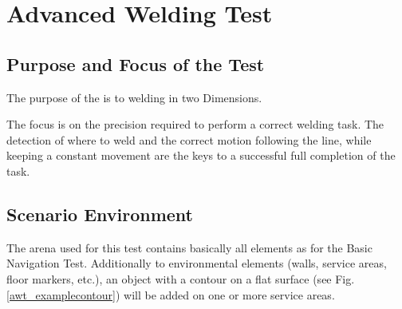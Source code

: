 \newpage
\section{Advanced Welding Test}

\subsection{Purpose and Focus of the Test}
The purpose of the  is to welding in two Dimensions. 
\par
The focus is on the precision required to perform a correct welding task. The detection of where to weld and the correct motion following the line, while keeping a constant movement are the keys to a successful full completion of the task. 

\subsection{Scenario Environment}
The arena used for this test contains basically all elements as for the Basic Navigation Test. Additionally to environmental elements (walls, service areas, floor markers, etc.), an object with a contour on a flat surface (see Fig. \ref{awt_examplecontour}) will be added on one or more service areas. 

